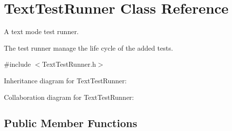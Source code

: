 \hypertarget{class_text_test_runner}{\section{Text\+Test\+Runner Class Reference}
\label{class_text_test_runner}
}


A text mode test runner.

The test runner manage the life cycle of the added tests.  




{\ttfamily \#include $<$Text\+Test\+Runner.\+h$>$}



Inheritance diagram for Text\+Test\+Runner\+:


Collaboration diagram for Text\+Test\+Runner\+:
\subsection*{Public Member Functions}

